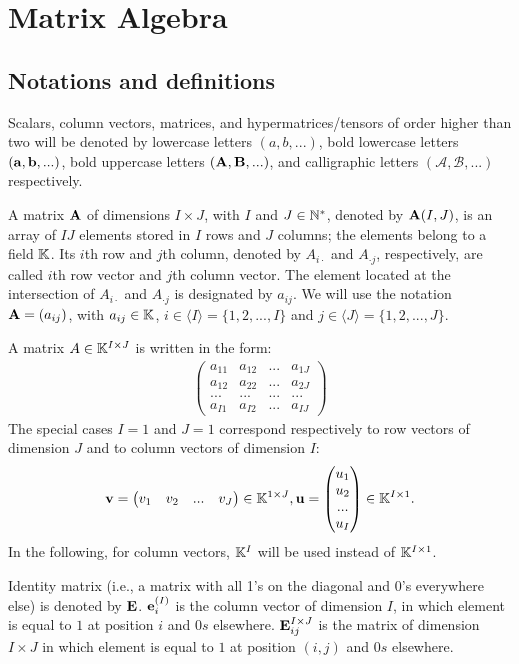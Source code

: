 \chapter{Matrix Algebra}

\section{Notations and definitions}

Scalars, column vectors, matrices, and hypermatrices/tensors of order higher than two will be 
denoted by lowercase letters $(a,b,...)$, 
bold lowercase letters $(\bold{a,b},...)$,
bold uppercase letters $(\bold{A},\bold{B},...)$,
and calligraphic letters $(\mathcal{A},\mathcal{B},...)$ respectively.

\par
A matrix $\bold{A}$ of dimensions $I\times J$, with $I$ and $J\in \mathbb{N}^*$,
denoted by $\bold{A}(I,J)$, is an array of $IJ$ elements stored in $I$ rows and 
$J$ columns; the elements belong to a field $\mathbb{K}$. Its $i$th row and
$j$th column, denoted by $A_{i\cdot}$ and $A_{\cdot j}$, respectively, are called $i$th row vector and
$j$th column vector. The element located at the intersection of $A_{i\cdot}$ and $A_{\cdot j}$ is 
designated by $a_{ij}$. We will use the notation $\bold{A}=(a_{ij})$, 
with $a_{ij}\in\mathbb{K}$, $i\in \langle {I} \rangle=\{1,2,...,I\}$ and 
$j\in \langle{J} \rangle=\{1,2,...,J\}$.
\par
A matrix $A\in\mathbb{K}^{I\times J}$ is written in the form:
\begin{align*}
    \begin{pmatrix}
        a_{11}& a_{12} & ... & a_{1J} \\
        a_{12}& a_{22} & ... & a_{2J} \\
        ...& ...  & ... & ...\\
        a_{I1}& a_{I2}  & ... & a_{IJ}
      \end{pmatrix}
\end{align*} 
The special cases $I=1$ and $J=1$ correspond respectively to row vectors of dimension $J$ 
and to column vectors of dimension $I$:
\begin{align*}
    \bold{v}=\begin{pmatrix}
        v_1& v_{2} & ... & v_{J} 
      \end{pmatrix}\in \mathbb{K}^{1\times J},
    \bold{u}=\begin{pmatrix}
        u_1\\ u_{2} \\ ... \\ u_{I} 
      \end{pmatrix}\in \mathbb{K}^{I\times 1}.
\end{align*}
In the following, for column vectors, $\mathbb{K}^{I}$ will be used instead of $\mathbb{K}^{I\times 1}$.
\par
Identity matrix (i.e., a matrix with all 1's on the diagonal
and 0's everywhere else) is denoted by $\bold{E}$.
$\bold{e}_{i}^{(I)}$ is the column vector of dimension $I$,
in which element is equal to $1$ at position $i$ and $0s$ elsewhere.
$\bold{E}_{ij}^{I\times J}$ is the matrix of dimension $I\times J$
in which element is equal to $1$ at position $(i,j)$ and $0s$ elsewhere.

